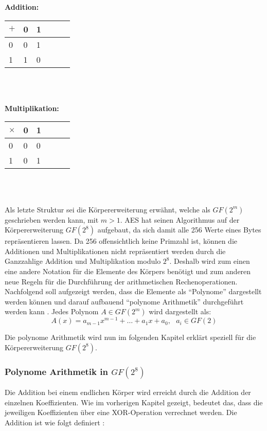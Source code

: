  \begin{minipage}{0.5\textwidth}
\textbf{Addition:} \\
    \begin{tabular}{l|lllll}
    $+$  & 0 & 1 \\ \hline
    0 	  & 0 & 1 \\
    1       & 1 & 0 \\
    \end{tabular}
    \\
    \\
\end{minipage}
\begin{minipage}{0.5\textwidth}
\textbf{Multiplikation:} \\
    \begin{tabular}{l|lllll}
    $\times$ & 0 & 1 \\ \hline
    0 	        & 0 & 0 \\
    1             & 0 & 1 \\
    \end{tabular}
    \\
    \\
\end{minipage}
 
 Als letzte Struktur sei die Körpererweiterung erwähnt, welche als $GF(2^m)$ geschrieben werden kann,
 mit $m > 1$. AES hat seinen Algorithmus auf der Körpererweiterung $GF(2^8)$ aufgebaut, da sich damit
 alle 256 Werte eines Bytes repräsentieren lassen. Da 256 offensichtlich keine Primzahl ist, können die
 Additionen und Multiplikationen nicht repräsentiert werden durch die Ganzzahlige Addition und Multiplikation
 modulo $2^8$. Deshalb wird zum einen eine andere Notation für die Elemente des Körpers benötigt und
 zum anderen neue Regeln für die Durchführung der arithmetischen Rechenoperationen. Nachfolgend soll
 aufgezeigt werden, dass die Elemente als ``Polynome'' dargestellt werden können und darauf aufbauend
 ``polynome Arithmetik'' durchgeführt werden kann \cite{paar10}. Jedes Polynom $A \in GF(2^m)$ wird
 dargestellt als:
 \begin{equation*}
   A(x) = a_{m-1}x^{m-1} + \hdots + a_1x + a_0, ~~~ a_i \in GF(2)
 \end{equation*}
 
 Die polynome Arithmetik wird nun im folgenden Kapitel erklärt speziell für die Körpererweiterung
 $GF(2^8)$.
 
 \subsubsection{Polynome Arithmetik in $GF(2^8)$}
 \label{polynome-arithmetic}
 Die Addition bei einem endlichen Körper wird erreicht durch die Addition der einzelnen Koeffizienten. Wie
 im vorherigen Kapitel gezeigt, bedeutet das, dass die jeweiligen Koeffizienten über eine XOR-Operation
 verrechnet werden. Die Addition ist wie folgt definiert \cite{paar10}:
 
